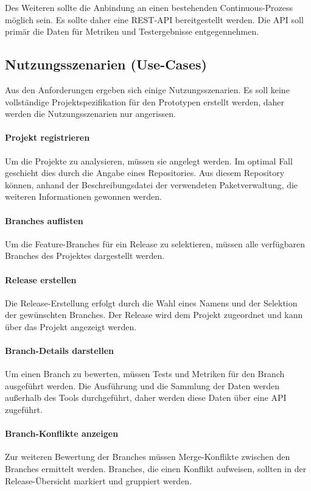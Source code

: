 Des Weiteren sollte die Anbindung an einen bestehenden Continuous-Prozess möglich sein. Es sollte daher eine REST-API bereitgestellt werden. Die API soll primär die Daten für Metriken und Testergebnisse entgegennehmen.

\subsection{Nutzungsszenarien (Use-Cases)}

Aus den Anforderungen ergeben sich einige Nutzungsszenarien. Es soll keine vollständige Projektspezifikation für den Prototypen erstellt werden, daher werden die Nutzungsszenarien nur angerissen. 

\paragraph{Projekt registrieren}
Um die Projekte zu analysieren, müssen sie angelegt werden. Im optimal Fall geschieht dies durch die Angabe eines Repositories. Aus diesem Repository können, anhand der Beschreibungsdatei der verwendeten Paketverwaltung, die weiteren Informationen gewonnen werden.

\paragraph{Branches auflisten}
Um die Feature-Branches für ein Release zu selektieren, müssen alle verfügbaren Branches des Projektes dargestellt werden. 

\paragraph{Release erstellen}
Die Release-Erstellung erfolgt durch die Wahl eines Namens und der Selektion der gewünschten Branches. Der Release wird dem Projekt zugeordnet und kann über das Projekt angezeigt werden.

\paragraph{Branch-Details darstellen}
Um einen Branch zu bewerten, müssen Tests und Metriken für den Branch ausgeführt werden. Die Ausführung und die Sammlung der Daten werden außerhalb des Tools durchgeführt, daher werden diese Daten über eine API zugeführt.

\paragraph{Branch-Konflikte anzeigen}
Zur weiteren Bewertung der Branches müssen Merge-Konflikte zwischen den Branches ermittelt werden. Branches, die einen Konflikt aufweisen, sollten in der Release-Übersicht markiert und gruppiert werden.

